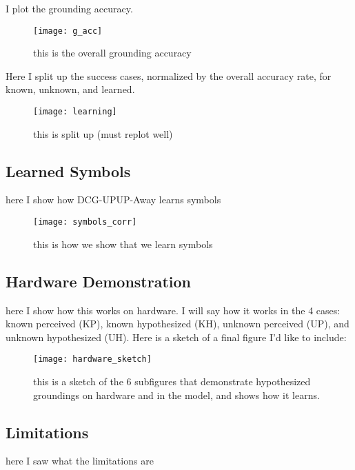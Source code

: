 I plot the grounding accuracy.
\begin{figure}[h]
\centering
\texttt{[image: g\_acc]}
\caption{this is the overall grounding accuracy}
\label{fig:g_acc}
\end{figure}

Here I split up the success cases, normalized by the overall accuracy rate, for known, unknown, and learned.
\begin{figure}[h]
\centering
\texttt{[image: learning]}
\caption{this is split up (must replot well)}
\label{fig:g_acc}
\end{figure}


\subsection{Learned Symbols}
here I show how DCG-UPUP-Away learns symbols
\begin{figure}[h]
\centering
\texttt{[image: symbols\_corr]}
\caption{this is how we show that we learn symbols}
\label{fig:g_acc}
\end{figure}

\subsection{Hardware Demonstration}
here I show how this works on hardware.
I will say how it works in the 4 cases: known perceived (KP), known hypothesized (KH), unknown perceived (UP), and unknown hypothesized (UH).
Here is a sketch of a final figure I'd like to include:

\begin{figure}[h]
\centering
\texttt{[image: hardware\_sketch]}
\caption{this is a sketch of the 6 subfigures that demonstrate hypothesized groundings on hardware and in the model, and shows how it learns.}
\label{fig:g_acc}
\end{figure}

\subsection{Limitations}
here I saw what the limitations are